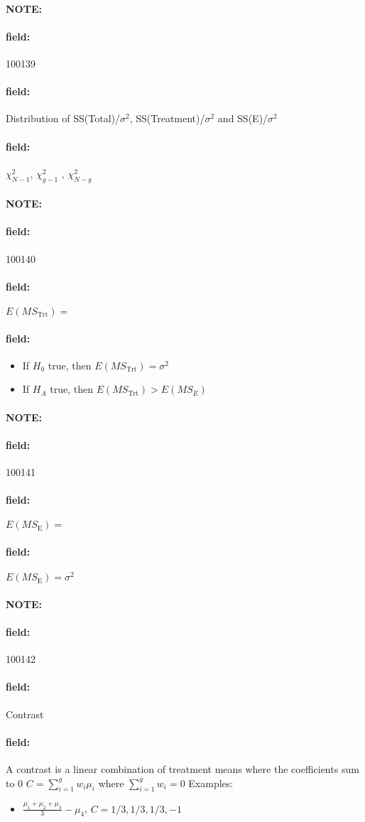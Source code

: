 \documentclass[12pt]{article}
\newenvironment{note}{\paragraph{NOTE:}}{}
\newenvironment{field}{\paragraph{field:}}{}
\begin{document}
\begin{note}
 \begin{field}
  \tiny 100139
 \end{field}
 \begin{field}
  Distribution of SS(Total)/$\sigma^2$, SS(Treatment)/$\sigma^2$ and SS(E)/$\sigma^2$
 \end{field}
 \begin{field}
  $\chi^2_{N-1}$, $\chi^2_{g-1}$ , $\chi^2_{N-g}$
 \end{field}
\end{note}

\begin{note}
 \begin{field}
  \tiny 100140
 \end{field}
 \begin{field}
  $E(MS_{\text{Trt}}) = $
 \end{field}
 \begin{field}
  \begin{itemize}
   \item If $H_0$ true, then $E(MS_{\text{Trt}}) = \sigma^2$
   \item If $H_A$ true, then $E(MS_{\text{Trt}})> E(MS_E)$
  \end{itemize}
 \end{field}
\end{note}

\begin{note}
 \begin{field}
  \tiny 100141
 \end{field}
 \begin{field}
  $E(MS_{\text{E}}) = $
 \end{field}
 \begin{field}
  $E(MS_{\text{E}}) = \sigma^2$
 \end{field}
\end{note}

\begin{note}
 \begin{field}
  \tiny 100142
 \end{field}
 \begin{field}
  Contrast
 \end{field}
 \begin{field}
  A contrast is a linear combination of treatment means where the coefficients sum to 0
  $C = \sum_{i=1}^g w_i \mu_i$ where $\sum_{i=1}^g w_i = 0$
  Examples:
  \begin{itemize}
   \item $\frac{\mu_1+\mu_2 +\mu_3 }{3} - \mu_4$, $C = 1/3,1/3,1/3,-1$
  \end{itemize}
 \end{field}
\end{note}
\end{document}
